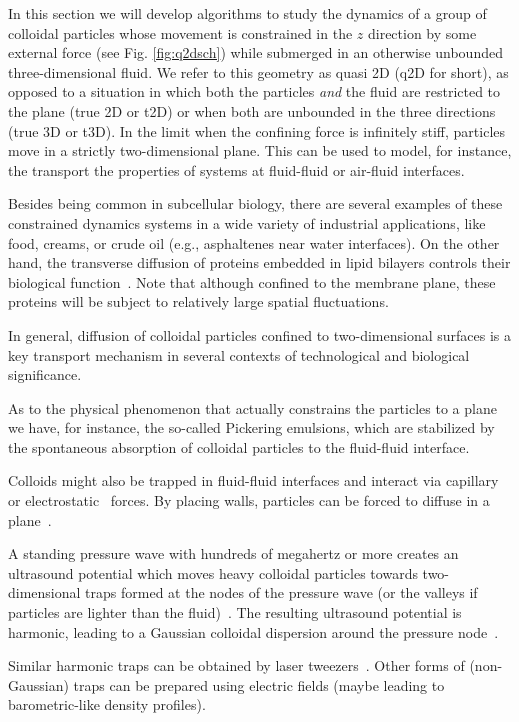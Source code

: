 \documentclass[ twoside,openright,titlepage,numbers=noenddot,%
headinclude,footinclude,cleardoublepage=empty,abstract=on,
BCOR=5mm,paper=b5,fontsize=11pt, dvipsnames
]{scrreprt}
\begin{document}
In this section we will develop algorithms to study the dynamics of a group of colloidal particles whose movement is constrained in the $z$ direction by some external force (see Fig. \ref{fig:q2dsch}) while submerged in an otherwise unbounded three-dimensional fluid. We refer to this geometry as quasi 2D (q2D for short), as opposed to a situation in which both the particles \emph{and} the fluid are restricted to the plane (true 2D or t2D) or when both are unbounded in the three directions (true 3D or t3D). In the limit when the confining force is infinitely stiff, particles move in a strictly two-dimensional plane. This can be used to model, for instance, the transport the properties of systems at fluid-fluid or air-fluid interfaces. 

Besides being common in subcellular biology, there are several examples of these constrained dynamics systems in a wide variety of industrial applications, like food, creams, or crude oil (e.g., asphaltenes near water interfaces).
On the other hand, the transverse diffusion of proteins embedded in lipid bilayers controls their biological function~\cite{Brown20112}.
Note that although confined to the membrane plane, these proteins will be subject to relatively large spatial fluctuations.

In general, diffusion of colloidal particles confined to two-dimensional surfaces is a key transport mechanism in several contexts of technological and biological significance.

As to the physical phenomenon that actually constrains the particles to a plane we have, for instance, the so-called Pickering emulsions, which are stabilized by the spontaneous absorption of colloidal particles to the fluid-fluid interface.

Colloids might also be trapped in fluid-fluid interfaces and interact via capillary~\cite{Dominguez2010} or electrostatic~\cite{Gao2016} forces. By placing walls, particles can be forced to diffuse in a plane~\cite{Lin2014}. 

A standing pressure wave with hundreds of megahertz or more creates an ultrasound potential which moves heavy colloidal particles towards two-dimensional traps formed at the nodes of the pressure wave (or the valleys if particles are lighter than the fluid)~\cite{Settnes2012,Balboa2013}. The resulting ultrasound potential is harmonic, leading to a Gaussian colloidal dispersion around the pressure node~\cite{Balboa2013}.

Similar harmonic traps can be obtained by laser tweezers~\cite{Ding2012}.
Other forms of (non-Gaussian) traps can be prepared using electric fields (maybe leading to barometric-like density profiles).
\end{document}
